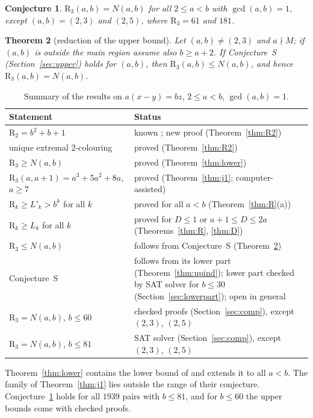 \documentclass[11pt,a4paper]{article}
\newtheorem{theorem}{Theorem}[section]
\newtheorem{conjecture}[theorem]{Conjecture}
\theoremstyle{definition}
\theoremstyle{remark}
\newcommand{\R}{\mathrm{R}}
\begin{document}
\begin{conjecture}\label{conj:C3}
$\R_3(a,b)=N(a,b)$ for all $2\le a<b$ with $\gcd(a,b)=1$, except $(a,b)=(2,3)$ and $(2,5)$, where $\R_3=61$ and $181$.
\end{conjecture}

\begin{theorem}[reduction of the upper bound]\label{thm:red}
Let $(a,b)\ne(2,3)$ and $a\nmid M$; if $(a,b)$ is outside the main region assume also $b\ge a+2$. If Conjecture~S (Section~\ref{sec:upper}) holds for $(a,b)$, then $\R_3(a,b)\le N(a,b)$, and hence $\R_3(a,b)=N(a,b)$.
\end{theorem}

\begin{table}[ht]
\centering
\small
\renewcommand{\arraystretch}{1.1}
\begin{tabular}{>{\raggedright}p{6.2cm}>{\raggedright\arraybackslash}p{7.4cm}}
\toprule
Statement & Status\\
\midrule
$\R_2=b^2+b+1$ & known \cite{Yao14}; new proof (Theorem~\ref{thm:R2})\\
unique extremal $2$-colouring & proved (Theorem~\ref{thm:R2})\\
$\R_3\ge N(a,b)$ & proved (Theorem~\ref{thm:lower})\\
$\R_3(a,a+1)=a^3+5a^2+8a$, $a\ge7$ & proved (Theorem~\ref{thm:j1}; computer-assisted)\\
$\R_k\ge L'_k>b^k$ for all $k$ & proved for all $a<b$ (Theorem~\ref{thm:R}(a))\\
$\R_k\ge L_k$ for all $k$ & proved for $D\le1$ or $a+1\le D\le 2a$ (Theorems~\ref{thm:R}, \ref{thm:D})\\
$\R_3\le N(a,b)$ & follows from Conjecture~S (Theorem~\ref{thm:red})\\
Conjecture~S & follows from its lower part (Theorem~\ref{thm:upind}); lower part checked by SAT solver for $b\le30$ (Section~\ref{sec:lowerpart}); open in general\\
$\R_3=N(a,b)$, $b\le60$ & checked proofs (Section~\ref{sec:comp}), except $(2,3)$, $(2,5)$\\
$\R_3=N(a,b)$, $b\le81$ & SAT solver (Section~\ref{sec:comp}), except $(2,3)$, $(2,5)$\\
\bottomrule
\end{tabular}
\caption{Summary of the results on $a(x-y)=bz$, $2\le a<b$, $\gcd(a,b)=1$.}
\end{table}

Theorem~\ref{thm:lower} contains the lower bound of \cite{AZB25} and extends it to all $a<b$. The family of Theorem~\ref{thm:j1} lies outside the range of their conjecture. Conjecture~\ref{conj:C3} holds for all $1939$ pairs with $b\le81$, and for $b\le60$ the upper bounds come with checked proofs.
\end{document}
